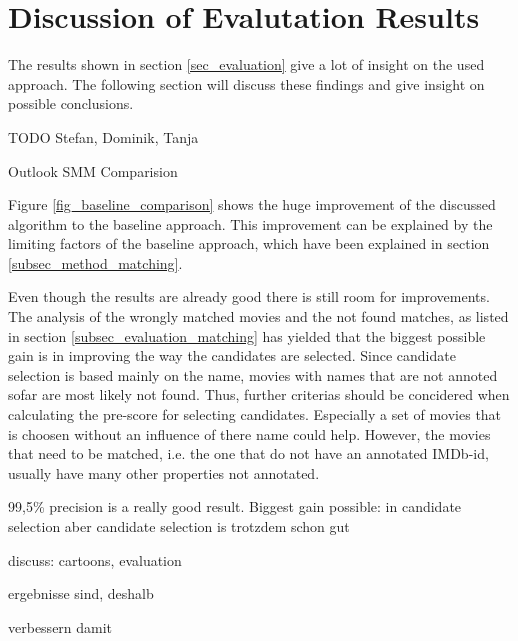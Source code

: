 \section{Discussion of Evalutation Results}
\label{sec_discussion}

The results shown in section \ref{sec_evaluation} give a lot of insight on the used approach.
The following section will discuss these findings and give insight on possible conclusions.

TODO Stefan, Dominik, Tanja

Outlook SMM Comparision

Figure \ref{fig_baseline_comparison} shows the huge improvement of the discussed algorithm to the baseline approach.
This improvement can be explained by the limiting factors of the baseline approach, which have been explained in section \ref{subsec_method_matching}.

Even though the results are already good there is still room for improvements.
The analysis of the wrongly matched movies and the not found matches, as listed in section \ref{subsec_evaluation_matching} has yielded that the biggest possible gain is in improving the way the candidates are selected.
Since candidate selection is based mainly on the name, movies with names that are not annoted sofar are most likely not found.
Thus, further criterias should be concidered when calculating the pre-score for selecting candidates.
Especially a set of movies that is choosen without an influence of there name could help.
However, the movies that need to be matched, i.e. the one that do not have an annotated IMDb-id, usually have many other properties not annotated.

99,5\% precision is a really good result.
Biggest gain possible: in candidate selection
aber candidate selection is trotzdem schon gut

discuss: cartoons, evaluation

ergebnisse sind, deshalb

verbessern damit

